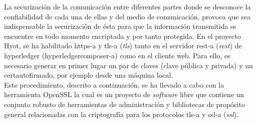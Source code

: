 \documentclass[12pt,a4paper, twoside]{report}
\begin{document}
	La securización de la comunicación entre diferentes partes donde se desconoce la confiabilidad de cada una de ellas y del medio de comunicación, provoca que sea indispensable la securización de ésta para que la información transmitida se encuentre en todo momento encriptada y por tanto protegida. En el proyecto Hyot, se ha habilitado \gls{https-a} y \gls{tls-a} (\textit{\gls{tls}}) tanto {\color{red} en el servidor \gls{rest-a} (\textit{\gls{rest}}) de \gls{hyperledger} (\gls{hyperledgercomposer-a}) como en el cliente web}. Para ello, es necesario generar en primer lugar un par de claves (clave pública y privada) y un \gls{certautofirmado}, por ejemplo desde una máquina local. \\
	
	Este procedimiento, descrito a continuación, se ha llevado a cabo con la herramienta OpenSSL la cual es un proyecto de \textit{software} libre que contiene un conjunto robusto de herramientas de administración y bibliotecas de propósito general relacionadas con la criptografía para los protocolos \gls{tls-a} y \gls{ssl-a} (\textit{\gls{ssl}}). 
		
\end{document}
